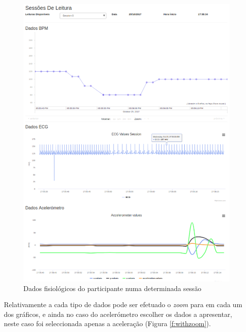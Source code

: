 \begin{figure}[H]
\centering
\includegraphics[width=1\textwidth]{imgs/dadosfisiologicos-web.png}
\caption[Dados fisiológicos do participante numa determinada sessão]{Dados fisiológicos do participante numa determinada sessão}
\label{f:leiturasdados}
\end{figure}
 Relativamente a cada tipo de dados pode ser efetuado o \textit{zoom} para em cada um dos gráficos, e ainda no caso do acelerómetro escolher os dados a apresentar, neste caso foi seleccionada apenas a aceleração (Figura \ref{f:withzoom}).
 
